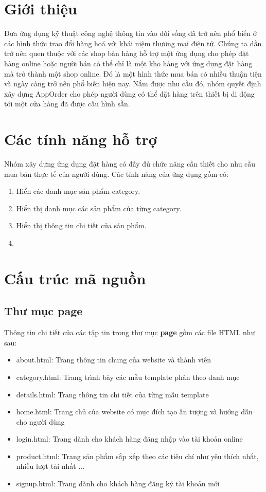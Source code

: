 \documentclass[a4paper]{article}
\begin{document}

\newpage
\tableofcontents

\newpage 
\listoffigures


\newpage
\section{Giới thiệu}
Đưa ứng dụng kỹ thuật công nghệ thông tin vào đời sống đã trở nên phổ biến ở các hình thức trao đổi hàng hoá với khái niệm thương mại điện tử. Chúng ta dần trở nên quen thuộc với các shop bàn hàng hỗ trợ một ứng dụng cho phép đặt hàng online hoặc người bán có thể chỉ là một kho hàng với ứng dụng đặt hàng mà trở thành một shop online. Đó là một hình thức mua bán có nhiều thuận tiện và ngày càng trở nên phổ biến hiện nay. Nắm được nhu cầu đó, nhóm quyết định xây dựng AppOrder cho phép người dùng có thể đặt hàng trên thiết bị di động tới một cửa hàng đã được cấu hình sẵn.
\section{Các tính năng hỗ trợ}
Nhóm xây dựng ứng dụng đặt hàng có đầy đủ chức năng cần thiết cho nhu cầu mua bán thực tế của người dùng. Các tính năng của ứng dụng gồm có:
\begin{enumerate}
    \item Hiển các danh mục sản phẩm category.
    \item Hiển thị danh mục các sản phẩm của từng category.
    \item Hiển thị thông tin chi tiết của sản phẩm.
    \item 
\end{enumerate}
\section{Cấu trúc mã nguồn}
\subsection{Thư mục page}
Thông tin chi tiết của các tập tin trong thư mục \textbf{page} gồm các file HTML như sau:

\begin{itemize}
    \item about.html: Trang thông tin chung của website và thành viên
    \item category.html: Trang trình bày các mẫu template phân theo danh mục
    \item details.html: Trang thông tin chi tiết của từng mẫu template 
    \item home.html: Trang chủ của website có mục đích tạo ấn tượng và hướng dẫn cho người dùng
    \item login.html: Trang dành cho khách hàng đăng nhập vào tài khoản online
    \item product.html: Trang sản phẩm sắp xếp theo các tiêu chí như yêu thích nhất, nhiều lượt tải nhất ...
    \item signup.html: Trang dành cho khách hàng đăng ký tài khoản mới
\end{itemize}
\end{document}

